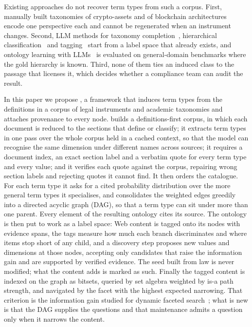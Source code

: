 Existing approaches do not recover term types from such a corpus. First,
manually built taxonomies of crypto-assets and of blockchain
architectures~\cite{tasca2019taxonomy,zhang2026cryptotaxonomy} encode one
perspective each and cannot be regenerated when an instrument changes. Second, LLM methods for taxonomy
completion~\cite{shi2024icon}, hierarchical
classification~\cite{zhang2025teleclass} and tagging~\cite{wan2024tntllm,
li2023taggpt} start from a label space that already exists, and ontology
learning with LLMs~\cite{babaeigiglou2023llms4ol} is evaluated on general-domain
benchmarks where the gold hierarchy is known. Third, none of them ties an induced class to the passage that licenses it,
which decides whether a compliance team can audit the result.

In this paper we propose \sys, a framework that induces term types from the
definitions in a corpus of legal instruments and academic taxonomies and
attaches provenance to every node. \sys builds a definitions-first corpus, in
which each document is reduced to the sections that define or classify; it
extracts term types in one pass over the whole corpus held in a cached context,
so that the model can recognise the same dimension under different names across
sources; it requires a document index, an exact section label and a verbatim
quote for every term type and every value; and it verifies each quote against
the corpus, repairing wrong section labels and rejecting quotes it cannot find.
It then orders the catalogue. For each term type it asks for a cited probability
distribution over the more general term types it specialises, and consolidates
the weighted edges greedily into a directed acyclic graph (DAG), so that a term
type can sit under more than one parent. Every element of the resulting ontology cites its source. The ontology is then
put to work as a label space: Web content is tagged onto its nodes with evidence spans, the tags
measure how much each branch discriminates and where items stop short of any
child, and a discovery step proposes new values and dimensions at those nodes,
accepting only candidates that raise the information gain and are supported by
verified evidence. The seed built from law is never modified; what the content
adds is marked as such. Finally the tagged content is indexed on the graph as bitsets,
queried by set algebra weighted by is-a path strength, and navigated by the
facet with the highest expected narrowing. That criterion is the information
gain studied for dynamic faceted search~\cite{roy2008minimum}; what is new is
that the DAG supplies the questions and that maintenance admits a question
only when it narrows the content.

